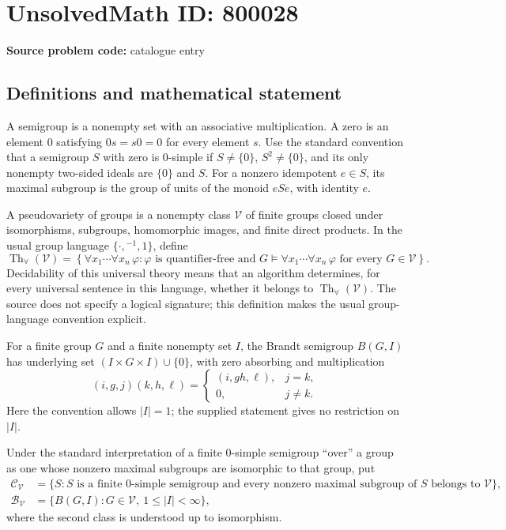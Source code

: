 \documentclass[11pt]{article}
\begin{document}
\section*{UnsolvedMath ID: 800028}
\textbf{Source problem code:} catalogue entry
\subsection{Definitions and mathematical statement}
A semigroup is a nonempty set with an associative multiplication. A zero is an element \(0\) satisfying \(0s=s0=0\) for every element \(s\). Use the standard convention that a semigroup \(S\) with zero is \(0\)-simple if \(S\ne\{0\}\), \(S^2\ne\{0\}\), and its only nonempty two-sided ideals are \(\{0\}\) and \(S\). For a nonzero idempotent \(e\in S\), its maximal subgroup is the group of units of the monoid \(eSe\), with identity \(e\).

A pseudovariety of groups is a nonempty class \(\mathcal V\) of finite groups closed under isomorphisms, subgroups, homomorphic images, and finite direct products. In the usual group language \(\{\cdot,{}^{-1},1\}\), define
\[
\operatorname{Th}_{\forall}(\mathcal V)
=\left\{\forall x_1\cdots\forall x_n\,\varphi:
\varphi\text{ is quantifier-free and }
G\models\forall x_1\cdots\forall x_n\,\varphi
\text{ for every }G\in\mathcal V\right\}.
\]
Decidability of this universal theory means that an algorithm determines, for every universal sentence in this language, whether it belongs to \(\operatorname{Th}_{\forall}(\mathcal V)\). The source does not specify a logical signature; this definition makes the usual group-language convention explicit.

For a finite group \(G\) and a finite nonempty set \(I\), the Brandt semigroup \(B(G,I)\) has underlying set \((I\times G\times I)\cup\{0\}\), with zero absorbing and multiplication
\[
(i,g,j)(k,h,\ell)=
\begin{cases}
(i,gh,\ell),&j=k,\\
0,&j\ne k.
\end{cases}
\]
Here the convention allows \(|I|=1\); the supplied statement gives no restriction on \(|I|\).

Under the standard interpretation of a finite \(0\)-simple semigroup ``over'' a group as one whose nonzero maximal subgroups are isomorphic to that group, put
\[
\begin{aligned}
\mathcal C_{\mathcal V}
&=\{S:S\text{ is a finite }0\text{-simple semigroup and every nonzero maximal subgroup of }S\text{ belongs to }\mathcal V\},\\
\mathcal B_{\mathcal V}
&=\{B(G,I):G\in\mathcal V,\ 1\le |I|<\infty\},
\end{aligned}
\]
where the second class is understood up to isomorphism.
\end{document}
